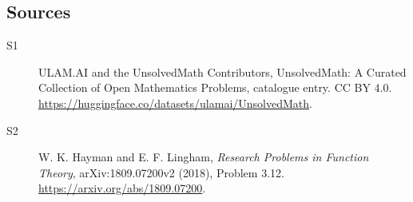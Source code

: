 \documentclass[11pt]{article}
\begin{document}
\subsection{Sources}
\begin{description}
\item[\hypertarget{source:statement:1}{S1}] ULAM.AI and the UnsolvedMath Contributors, UnsolvedMath: A Curated Collection of Open Mathematics Problems, catalogue entry. CC BY 4.0. \url{https://huggingface.co/datasets/ulamai/UnsolvedMath}.
\item[\hypertarget{source:statement:2}{S2}] W. K. Hayman and E. F. Lingham, \emph{Research Problems in Function Theory}, arXiv:1809.07200v2 (2018), Problem 3.12. \url{https://arxiv.org/abs/1809.07200}.
\end{description}
\label{end:statement}
\end{document}
